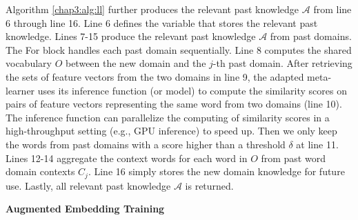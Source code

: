 Algorithm \ref{chap3:alg:ll} further produces the relevant past knowledge $\mathcal{A}$ from line 6 through line 16.
Line 6 defines the variable that stores the relevant past knowledge.
Lines 7-15 produce the relevant past knowledge $\mathcal{A}$ from past domains.
The For block handles each past domain sequentially.
Line 8 computes the shared vocabulary $O$ between the new domain and the $j$-th past domain.
After retrieving the sets of feature vectors from the two domains in line 9, the adapted meta-learner uses its inference function (or model) to compute the similarity scores on pairs of feature vectors representing the same word from two domains (line 10).
The inference function can parallelize the computing of similarity scores in a high-throughput setting (e.g., GPU inference) to speed up.
Then we only keep the words from past domains with a score higher than a threshold $\delta$ at line 11.
Lines 12-14 aggregate the context words for each word in $O$ from past word domain contexts $C_j$.
Line 16 simply stores the new domain knowledge for future use.
Lastly, all relevant past knowledge $\mathcal{A}$ is returned.

\textbf{Augmented Embedding Training}
\label{chap3:sec:aet}

